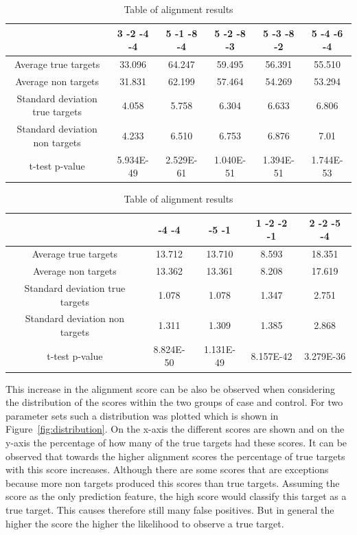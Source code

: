 \documentclass[12pt]{article}
\begin{document}
\begin{table}
\label{table:results}
\footnotesize
\caption{Table of alignment results}
\vspace{0.3cm}
\begin{tabular}{c|c|c|c|c|c}
& 3 -2 -4 -4 & 5 -1 -8 -4 & 5 -2 -8 -3 & 5 -3 -8 -2 & 5 -4 -6 -4 \\
\hline\hline
Average true targets & 33.096 & 64.247 & 59.495	& 56.391 & 55.510\\
Average	non targets & 31.831 & 62.199 & 57.464 & 54.269 & 53.294 \\
\hline
Standard deviation true targets & 4.058	& 5.758 & 6.304	& 6.633 & 6.806\\
Standard deviation non targets & 4.233 & 6.510 & 6.753 & 6.876 & 7.01\\
\hline
t-test p-value & 5.934E-49 & 2.529E-61 & 1.040E-51 & 1.394E-51 & 1.744E-53 \\\hline
\end{tabular}\vspace{0.5cm}


\begin{tabular}{c|c|c|c|c}
& -4 -4 & -5 -1 & 1 -2 -2 -1 & 2 -2 -5 -4  \\
\hline\hline
Average true targets & 13.712 & 13.710 & 8.593 & 18.351\\
Average	non targets & 13.362 & 13.361 &	8.208 &	17.619 \\
\hline
Standard deviation true targets & 1.078	& 1.078	& 1.347	& 2.751\\
Standard deviation non targets & 1.311 & 1.309 & 1.385 & 2.868\\
\hline
t-test p-value & 8.824E-50 & 1.131E-49 & 8.157E-42 & 3.279E-36 \\
\hline
\end{tabular}

\end{table}

This increase in the alignment score can be also be observed when considering the distribution of the scores within the two groups of case and control. For two parameter sets such a distribution was plotted which is shown in Figure~\ref{fig:distribution}. On the x-axis the different scores are shown and on the y-axis the percentage of how many of the true targets had these scores. It can be observed that towards the higher alignment scores the percentage of true targets with this score increases. Although there are some scores that are exceptions because more non targets produced this scores than true targets. Assuming the score as the only prediction feature, the high score would classify this target as a true target. This causes therefore still many false positives. But in general the higher the score the higher the likelihood to observe a true target.
\end{document}

